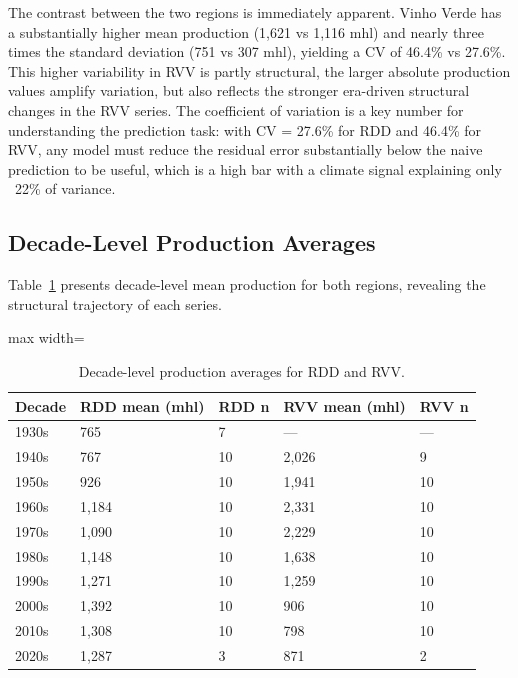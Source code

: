 The contrast between the two regions is immediately apparent. Vinho Verde has a substantially higher mean production (1,621 vs 1,116 mhl) and nearly three times the standard deviation (751 vs 307 mhl), yielding a CV of 46.4\% vs 27.6\%. This higher variability in RVV is partly structural, the larger absolute production values amplify variation, but also reflects the stronger era-driven structural changes in the RVV series. The coefficient of variation is a key number for understanding the prediction task: with CV = 27.6\% for RDD and 46.4\% for RVV, any model must reduce the residual error substantially below the naive prediction to be useful, which is a high bar with a climate signal explaining only ~22\% of variance.


\subsection{Decade-Level Production Averages}\label{app_sub:decadelevel_production_averages}

Table~\ref{tab:appb_2} presents decade-level mean production for both regions, revealing the structural trajectory of each series.

\begin{table}[htbp]
  \centering
  \caption{Decade-level production averages for RDD and RVV.}\label{tab:appb_2}
  \footnotesize
  \begin{adjustbox}{max width=\textwidth}
    \begin{tabularx}{\textwidth}{l|p{4.5cm}|l|l|X}
  \toprule
  Decade & RDD mean (mhl) & RDD n & RVV mean (mhl) & RVV n \\
  \midrule
  1930s & 765 & 7 & --- & --- \\
  1940s & 767 & 10 & 2,026 & 9 \\
  1950s & 926 & 10 & 1,941 & 10 \\
  1960s & 1,184 & 10 & 2,331 & 10 \\
  1970s & 1,090 & 10 & 2,229 & 10 \\
  1980s & 1,148 & 10 & 1,638 & 10 \\
  1990s & 1,271 & 10 & 1,259 & 10 \\
  2000s & 1,392 & 10 & 906 & 10 \\
  2010s & 1,308 & 10 & 798 & 10 \\
  2020s & 1,287 & 3 & 871 & 2 \\
  \bottomrule
  \end{tabularx}
  \end{adjustbox}

\end{table}


